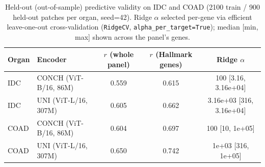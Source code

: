 \begin{table}[t]
\centering
\caption{Held-out (out-of-sample) predictive validity on IDC and COAD (2100 train / 900 held-out patches per organ, seed=42). Ridge $\alpha$ selected per-gene via efficient leave-one-out cross-validation (\texttt{RidgeCV}, \texttt{alpha\_per\_target=True}); median [min, max] shown across the panel's genes.}
\label{tab:validity}
\begin{tabular}{llccc}
\toprule
Organ & Encoder & $r$ (whole panel) & $r$ (Hallmark genes) & Ridge $\alpha$ \\
\midrule
IDC & CONCH (ViT-B/16, 86M) & 0.559 & 0.615 & 100 [3.16, 3.16e+04] \\
IDC & UNI (ViT-L/16, 307M) & 0.605 & 0.662 & 3.16e+03 [316, 3.16e+04] \\
COAD & CONCH (ViT-B/16, 86M) & 0.604 & 0.697 & 100 [10, 1e+05] \\
COAD & UNI (ViT-L/16, 307M) & 0.650 & 0.742 & 1e+03 [316, 1e+05] \\
\bottomrule
\end{tabular}
\end{table}
